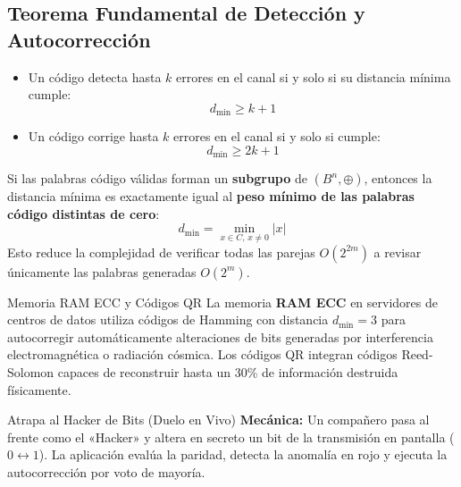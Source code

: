 \documentclass[11pt,a4paper]{article}
\begin{document}
\subsection{Teorema Fundamental de Detección y Autocorrección}
\begin{teorema}
\begin{itemize}[noitemsep]
  \item Un código detecta hasta $k$ errores en el canal si y solo si su distancia mínima cumple:
  \begin{equation}
    d_{\min} \ge k + 1
  \end{equation}
  \item Un código corrige hasta $k$ errores en el canal si y solo si cumple:
  \begin{equation}
    d_{\min} \ge 2k + 1
  \end{equation}
\end{itemize}
\end{teorema}

\begin{teorema}
Si las palabras código válidas forman un \textbf{subgrupo} de $(B^n, \oplus)$, entonces la distancia mínima es exactamente igual al \textbf{peso mínimo de las palabras código distintas de cero}:
\begin{equation}
  d_{\min} = \min_{x \in C, \, x \neq 0} |x|
\end{equation}
Esto reduce la complejidad de verificar todas las parejas $O(2^{2m})$ a revisar únicamente las palabras generadas $O(2^m)$.
\end{teorema}

\begin{aplicacion}{Memoria RAM ECC y Códigos QR}
La memoria \textbf{RAM ECC} en servidores de centros de datos utiliza códigos de Hamming con distancia $d_{\min} = 3$ para autocorregir automáticamente alteraciones de bits generadas por interferencia electromagnética o radiación cósmica. Los códigos QR integran códigos Reed-Solomon capaces de reconstruir hasta un 30\% de información destruida físicamente.
\end{aplicacion}

\begin{minijuego}{Atrapa al Hacker de Bits (Duelo en Vivo)}
\textbf{Mecánica:} Un compañero pasa al frente como el «Hacker» y altera en secreto un bit de la transmisión en pantalla ($0 \leftrightarrow 1$). La aplicación evalúa la paridad, detecta la anomalía en rojo y ejecuta la autocorrección por voto de mayoría.
\end{minijuego}
\end{document}
